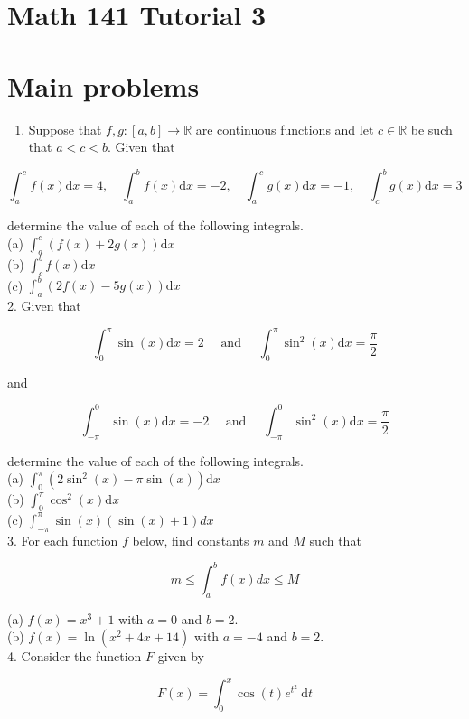 \documentclass[10pt]{article}
\begin{document}
\section*{Math 141 Tutorial 3}
\section*{Main problems}
\begin{enumerate}
  \item Suppose that $f, g:[a, b] \rightarrow \mathbb{R}$ are continuous functions and let $c \in \mathbb{R}$ be such that $a<c<b$. Given that
\end{enumerate}

$$
\int_{a}^{c} f(x) \mathrm{d} x=4, \quad \int_{a}^{b} f(x) \mathrm{d} x=-2, \quad \int_{a}^{c} g(x) \mathrm{d} x=-1, \quad \int_{c}^{b} g(x) \mathrm{d} x=3
$$

determine the value of each of the following integrals.\\
(a) $\int_{a}^{c}(f(x)+2 g(x)) \mathrm{d} x$\\
(b) $\int_{c}^{b} f(x) \mathrm{d} x$\\
(c) $\int_{a}^{b}(2 f(x)-5 g(x)) \mathrm{d} x$\\
2. Given that

$$
\int_{0}^{\pi} \sin (x) \mathrm{d} x=2 \quad \text { and } \quad \int_{0}^{\pi} \sin ^{2}(x) \mathrm{d} x=\frac{\pi}{2}
$$

and

$$
\int_{-\pi}^{0} \sin (x) \mathrm{d} x=-2 \quad \text { and } \quad \int_{-\pi}^{0} \sin ^{2}(x) \mathrm{d} x=\frac{\pi}{2}
$$

determine the value of each of the following integrals.\\
(a) $\int_{0}^{\pi}\left(2 \sin ^{2}(x)-\pi \sin (x)\right) \mathrm{d} x$\\
(b) $\int_{0}^{\pi} \cos ^{2}(x) \mathrm{d} x$\\
(c) $\int_{-\pi}^{\pi} \sin (x)(\sin (x)+1) d x$\\
3. For each function $f$ below, find constants $m$ and $M$ such that

$$
m \leq \int_{a}^{b} f(x) d x \leq M
$$

(a) $f(x)=x^{3}+1$ with $a=0$ and $b=2$.\\
(b) $f(x)=\ln \left(x^{2}+4 x+14\right)$ with $a=-4$ and $b=2$.\\
4. Consider the function $F$ given by

$$
F(x)=\int_{0}^{x} \cos (t) e^{t^{2}} \mathrm{~d} t
$$
\end{document}
